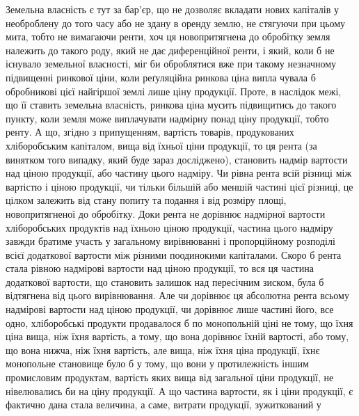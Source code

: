 Земельна власність є тут за бар’єр, що не дозволяє вкладати нових капіталів
у необроблену до того часу або не здану в оренду землю, не стягуючи
при цьому мита, тобто не вимагаючи ренти, хоч ця новопритягнена до обробітку
земля належить до такого роду, який не дає диференційної ренти, і який, коли б не існувало земельної
власності, міг би оброблятися вже при такому незначному підвищенні ринкової ціни, коли реґуляційна
ринкова ціна випла чувала б обробникові цієї найгіршої землі лише ціну продукції. Проте, в наслідок
межі, що її ставить земельна власність, ринкова ціна мусить підвищитись до такого пункту, коли земля
може виплачувати надмірну понад ціну продукції, тобто ренту. А що, згідно з припущенням, вартість
товарів, продукованих хліборобським капіталом, вища від їхньої ціни продукції, то ця рента (за
винятком того випадку, який буде зараз досліджено), становить надмір вартости над ціною продукції,
або частину цього надміру. Чи рівна рента всій різниці між вартістю і ціною продукції, чи тільки
більшій або меншій частині цієї різниці, це цілком залежить від стану попиту та подання і від
розміру площі, новопритягненої до обробітку. Доки рента не дорівнює надмірної вартости хліборобських
продуктів над їхньою ціною продукції, частина цього надміру завжди братиме участь у загальному
вирівнюванні і пропорційному розподілі всієї додаткової вартости між різними поодинокими капіталами.
Скоро б рента стала рівною надмірові вартости над ціною продукції, то вся ця частина додаткової
вартости, що становить залишок над пересічним зиском, була б відтягнена від цього вирівнювання. Але
чи дорівнює ця абсолютна рента всьому надмірові вартости над ціною продукції, чи дорівнює лише
частині його, все
одно, хліборобські продукти продавалося б по монопольній ціні не тому, що
їхня ціна вища, ніж їхня вартість, а тому, що вона дорівнює їхній вартості,
або тому, що вона нижча, ніж їхня вартість, але вища, ніж їхня ціна продукції, їхнє монопольне
становище було б у тому, що вони у
протилежність іншим промисловим продуктам, вартість яких вища від загальної ціни продукції, не
нівелювались би на ціну продукції. А що частина вартости, як і ціни продукції, є фактично дана стала
величина, а саме, витрати продукції, зужиткований у
\parbreak{}  %
